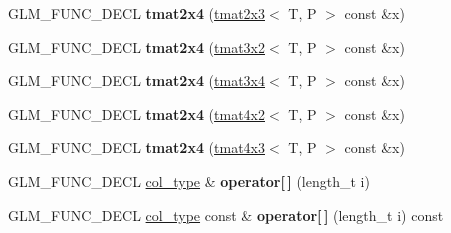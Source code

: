 \begin{DoxyCompactItemize}
\item 
\hypertarget{structglm_1_1detail_1_1tmat2x4_a03a38c13272b397389f748a852b70bbd}{G\-L\-M\-\_\-\-F\-U\-N\-C\-\_\-\-D\-E\-C\-L {\bfseries tmat2x4} (\hyperlink{structglm_1_1detail_1_1tmat2x3}{tmat2x3}$<$ T, P $>$ const \&x)}\label{structglm_1_1detail_1_1tmat2x4_a03a38c13272b397389f748a852b70bbd}

\item 
\hypertarget{structglm_1_1detail_1_1tmat2x4_afc4a553b87823b8a974f0f9633fbe21b}{G\-L\-M\-\_\-\-F\-U\-N\-C\-\_\-\-D\-E\-C\-L {\bfseries tmat2x4} (\hyperlink{structglm_1_1detail_1_1tmat3x2}{tmat3x2}$<$ T, P $>$ const \&x)}\label{structglm_1_1detail_1_1tmat2x4_afc4a553b87823b8a974f0f9633fbe21b}

\item 
\hypertarget{structglm_1_1detail_1_1tmat2x4_a4366b68e3fe9368c0b8815ffd54c2a86}{G\-L\-M\-\_\-\-F\-U\-N\-C\-\_\-\-D\-E\-C\-L {\bfseries tmat2x4} (\hyperlink{structglm_1_1detail_1_1tmat3x4}{tmat3x4}$<$ T, P $>$ const \&x)}\label{structglm_1_1detail_1_1tmat2x4_a4366b68e3fe9368c0b8815ffd54c2a86}

\item 
\hypertarget{structglm_1_1detail_1_1tmat2x4_a758d4611a4d501821627c8bfbc4e842e}{G\-L\-M\-\_\-\-F\-U\-N\-C\-\_\-\-D\-E\-C\-L {\bfseries tmat2x4} (\hyperlink{structglm_1_1detail_1_1tmat4x2}{tmat4x2}$<$ T, P $>$ const \&x)}\label{structglm_1_1detail_1_1tmat2x4_a758d4611a4d501821627c8bfbc4e842e}

\item 
\hypertarget{structglm_1_1detail_1_1tmat2x4_a535452a34980c66d927256a8c5244fea}{G\-L\-M\-\_\-\-F\-U\-N\-C\-\_\-\-D\-E\-C\-L {\bfseries tmat2x4} (\hyperlink{structglm_1_1detail_1_1tmat4x3}{tmat4x3}$<$ T, P $>$ const \&x)}\label{structglm_1_1detail_1_1tmat2x4_a535452a34980c66d927256a8c5244fea}

\item 
\hypertarget{structglm_1_1detail_1_1tmat2x4_a6227fe9230c96905cd82b40fbbba833b}{G\-L\-M\-\_\-\-F\-U\-N\-C\-\_\-\-D\-E\-C\-L \hyperlink{structglm_1_1detail_1_1tvec4}{col\-\_\-type} \& {\bfseries operator\mbox{[}$\,$\mbox{]}} (length\-\_\-t i)}\label{structglm_1_1detail_1_1tmat2x4_a6227fe9230c96905cd82b40fbbba833b}

\item 
\hypertarget{structglm_1_1detail_1_1tmat2x4_a5b1e3d06ddd4f18288d932a303cecef0}{G\-L\-M\-\_\-\-F\-U\-N\-C\-\_\-\-D\-E\-C\-L \hyperlink{structglm_1_1detail_1_1tvec4}{col\-\_\-type} const \& {\bfseries operator\mbox{[}$\,$\mbox{]}} (length\-\_\-t i) const }\label{structglm_1_1detail_1_1tmat2x4_a5b1e3d06ddd4f18288d932a303cecef0}


\end{DoxyCompactItemize}
